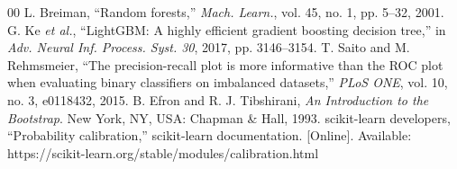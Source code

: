 \documentclass[conference]{IEEEtran}
\begin{document}
\begin{thebibliography}{00}
 L. Breiman, ``Random forests,'' \emph{Mach. Learn.}, vol. 45, no. 1, pp. 5--32, 2001.
 G. Ke \emph{et al.}, ``LightGBM: A highly efficient gradient boosting decision tree,'' in \emph{Adv. Neural Inf. Process. Syst. 30}, 2017, pp. 3146--3154.
 T. Saito and M. Rehmsmeier, ``The precision-recall plot is more informative than the ROC plot when evaluating binary classifiers on imbalanced datasets,'' \emph{PLoS ONE}, vol. 10, no. 3, e0118432, 2015.
 B. Efron and R. J. Tibshirani, \emph{An Introduction to the Bootstrap}. New York, NY, USA: Chapman \& Hall, 1993.
 scikit-learn developers, ``Probability calibration,'' scikit-learn documentation. [Online]. Available: https://scikit-learn.org/stable/modules/calibration.html
\end{thebibliography}
\end{document}
